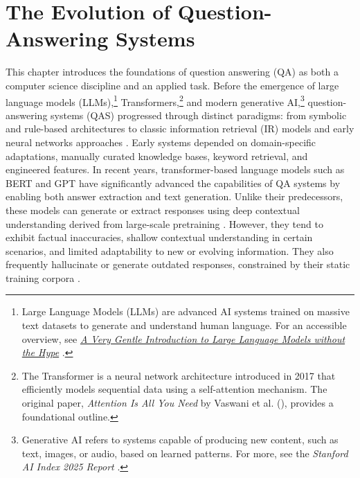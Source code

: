 \chapter{The Evolution of Question-Answering Systems}
\label{chap:QAS}
\sloppy
\begin{spacing}{1.5}

This chapter introduces the foundations of question answering (QA) as both a computer science discipline and an applied task. Before the emergence of large language models (LLMs),\footnote{Large Language Models (LLMs) are advanced AI systems trained on massive text datasets to generate and understand human language. For an accessible overview, see \href{https://mark-riedl.medium.com/a-very-gentle-introduction-to-large-language-models-without-the-hype-5f67941fa59e}{\textit{A Very Gentle Introduction to Large Language Models without the Hype}} \citep{riedl_very_2023}.} Transformers,\footnote{The Transformer is a neural network architecture introduced in 2017 that efficiently models sequential data using a self-attention mechanism. The original paper, \textit{Attention Is All You Need} by Vaswani et al. (\citeyear{vaswani_attention_2017}), provides a foundational outline.} and modern generative AI,\footnote{Generative AI refers to systems capable of producing new content, such as text, images, or audio, based on learned patterns. For more, see the \textit{Stanford AI Index 2025 Report} \citep{maslej_artificial_2025}.} question-answering systems (QAS) progressed through distinct paradigms: from symbolic and rule-based architectures to classic information retrieval (IR) models and early neural networks approaches \citep{jurafsky_chapter_2024,antoniou_survey_2022}. Early systems depended on domain-specific adaptations, manually curated knowledge bases, keyword retrieval, and engineered features. In recent years, transformer-based language models such as BERT and GPT have significantly advanced the capabilities of QA systems by enabling both answer extraction and text generation. Unlike their predecessors, these models can generate or extract responses using deep contextual understanding derived from large-scale pretraining \citep{kaplan_scaling_2020}. However, they tend to exhibit factual inaccuracies, shallow contextual understanding in certain scenarios, and limited adaptability to new or evolving information. They also frequently hallucinate or generate outdated responses, constrained by their static training corpora \citep{harsh_comprehending_2024}.


\end{spacing}
